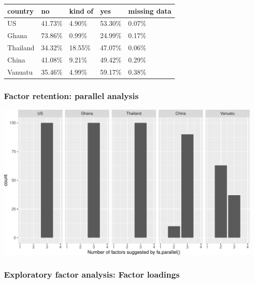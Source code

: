 \documentclass[
  man]{apa6}
\begin{document}
\begin{tabular}{l|l|l|l|l}
\hline
country & no & kind of & yes & missing data\\
\hline
US & 41.73\% & 4.90\% & 53.30\% & 0.07\%\\
\hline
Ghana & 73.86\% & 0.99\% & 24.99\% & 0.17\%\\
\hline
Thailand & 34.32\% & 18.55\% & 47.07\% & 0.06\%\\
\hline
China & 41.08\% & 9.21\% & 49.42\% & 0.29\%\\
\hline
Vanuatu & 35.46\% & 4.99\% & 59.17\% & 0.38\%\\
\hline
\end{tabular}

\hypertarget{factor-retention-parallel-analysis}{%
\subsubsection{Factor retention: parallel analysis}\label{factor-retention-parallel-analysis}}

\includegraphics{Script_Re_Weisman_2021_Group1_2024_files/figure-latex/parallel dist adults-1.pdf}

\hypertarget{exploratory-factor-analysis-factor-loadings}{%
\subsubsection{Exploratory factor analysis: Factor loadings}\label{exploratory-factor-analysis-factor-loadings}}
\end{document}
